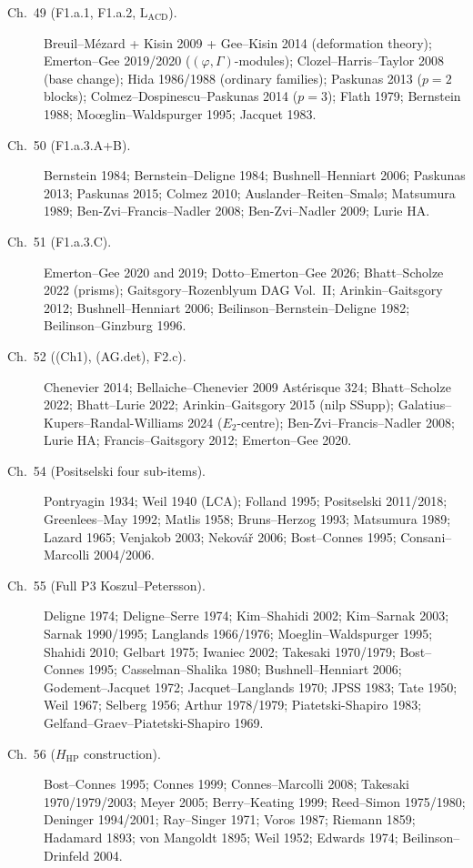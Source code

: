 \begin{description}
\item[Ch.~49 (F1.a.1, F1.a.2, \(\mathrm{L}_{\mathrm{ACD}}\)).]
Breuil--M{\'e}zard + Kisin 2009 + Gee--Kisin 2014 (deformation
theory); Emerton--Gee 2019/2020 (\((\varphi,\Gamma)\)-modules);
Clozel--Harris--Taylor 2008 (base change); Hida 1986/1988
(ordinary families); Paskunas 2013 (\(p=2\) blocks);
Colmez--Dospinescu--Paskunas 2014 (\(p=3\)); Flath 1979; Bernstein
1988; Mo{\oe}glin--Waldspurger 1995; Jacquet 1983.

\item[Ch.~50 (F1.a.3.A+B).] Bernstein 1984; Bernstein--Deligne
1984; Bushnell--Henniart 2006; Paskunas 2013; Paskunas 2015;
Colmez 2010; Auslander--Reiten--Smal\o{};
Matsumura 1989; Ben-Zvi--Francis--Nadler 2008; Ben-Zvi--Nadler
2009; Lurie HA.

\item[Ch.~51 (F1.a.3.C).] Emerton--Gee 2020 and 2019;
Dotto--Emerton--Gee 2026; Bhatt--Scholze 2022 (prisms);
Gaitsgory--Rozenblyum DAG Vol.~II; Arinkin--Gaitsgory 2012;
Bushnell--Henniart 2006; Beilinson--Bernstein--Deligne 1982;
Beilinson--Ginzburg 1996.

\item[Ch.~52 ((Ch1), (AG.det), F2.c).]
Chenevier 2014; Bellaiche--Chenevier 2009
Ast\'erisque 324; Bhatt--Scholze 2022; Bhatt--Lurie 2022;
Arinkin--Gaitsgory 2015 (nilp SSupp);
Galatius--Kupers--Randal-Williams 2024 (\(E_{2}\)-centre);
Ben-Zvi--Francis--Nadler 2008; Lurie HA;
Francis--Gaitsgory 2012; Emerton--Gee 2020.

\item[Ch.~54 (Positselski four sub-items).] Pontryagin 1934;
Weil 1940 (LCA); Folland 1995; Positselski 2011/2018;
Greenlees--May 1992; Matlis 1958; Bruns--Herzog 1993;
Matsumura 1989; Lazard 1965; Venjakob 2003; Nekov\'a\v{r} 2006;
Bost--Connes 1995; Consani--Marcolli 2004/2006.

\item[Ch.~55 (Full P3 Koszul--Petersson).] Deligne 1974;
Deligne--Serre 1974; Kim--Shahidi 2002; Kim--Sarnak 2003;
Sarnak 1990/1995; Langlands 1966/1976; Moeglin--Waldspurger 1995;
Shahidi 2010; Gelbart 1975; Iwaniec 2002; Takesaki 1970/1979;
Bost--Connes 1995; Casselman--Shalika 1980; Bushnell--Henniart 2006;
Godement--Jacquet 1972; Jacquet--Langlands 1970; JPSS 1983;
Tate 1950; Weil 1967; Selberg 1956; Arthur 1978/1979;
Piatetski-Shapiro 1983; Gelfand--Graev--Piatetski-Shapiro 1969.

\item[Ch.~56 (\(H_{\mathrm{HP}}\) construction).] Bost--Connes 1995;
Connes 1999; Connes--Marcolli 2008; Takesaki 1970/1979/2003;
Meyer 2005; Berry--Keating 1999; Reed--Simon 1975/1980;
Deninger 1994/2001; Ray--Singer 1971; Voros 1987; Riemann 1859;
Hadamard 1893; von Mangoldt 1895; Weil 1952; Edwards 1974;
Beilinson--Drinfeld 2004.


\end{description}
